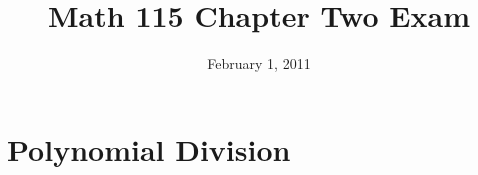 \documentclass[fleqn,addpoints]{exam}
\title{Math 115 Chapter Two Exam}
\date{February 1, 2011}
\author{}
\begin{document}
\maketitle

\ifprintanswers
\else
\vspace{0.2in}
\vspace{0.2in}

\begin{center}
\gradetable[h][pages]
\end{center}

\fi

\section{Polynomial Division} 
\end{document}
